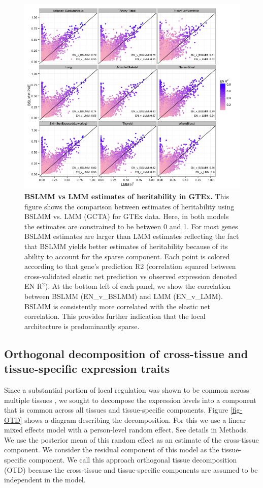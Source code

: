 \documentclass[10pt,letterpaper]{article}
\begin{document}
\begin{figure}[H]
\includegraphics[width=12cm]{Figures/Fig-GTEx_TW_PVE_v_h2.png}
\caption{{\bf BSLMM vs LMM estimates of heritability in GTEx.} 
This figure shows the comparison between estimates of heritability using BSLMM vs. LMM (GCTA) for GTEx data. Here, in both models the estimates are constrained to be between 0 and 1. For most genes BSLMM estimates are larger than LMM estimates reflecting the fact that BSLMM yields better estimates of heritability because of its ability to account for the sparse component. Each point is colored according to that gene's prediction R2 (correlation squared between cross-validated elastic net prediction vs observed expression denoted EN R$^2$). At the bottom left of each panel, we show the correlation between BSLMM (EN\_v\_BSLMM) and LMM (EN\_v\_LMM). BSLMM is consistently more correlated with the elastic net correlation. This provides further indication that the local architecture is predominantly sparse.}
\label{fig-gtex-pve-h2}
\end{figure}

\subsection*{Orthogonal decomposition of cross-tissue and tissue-specific expression traits}

Since a substantial portion of local regulation was shown to be common across multiple tissues \cite{Ardlie_2015}, we sought to decompose the expression levels into a component that is common across all tissues and tissue-specific components. Figure \ref{fig-OTD} shows a diagram describing the decomposition. 
For this we use a linear mixed effects model with a person-level random effect. See details in Methods. We use the posterior mean of this random effect as an estimate of the cross-tissue component. We consider the residual component of this model as the tissue-specific component. We call this approach orthogonal tissue decomposition (OTD) because the cross-tissue and tissue-specific components are assumed to be independent in the model. 
\end{document}
